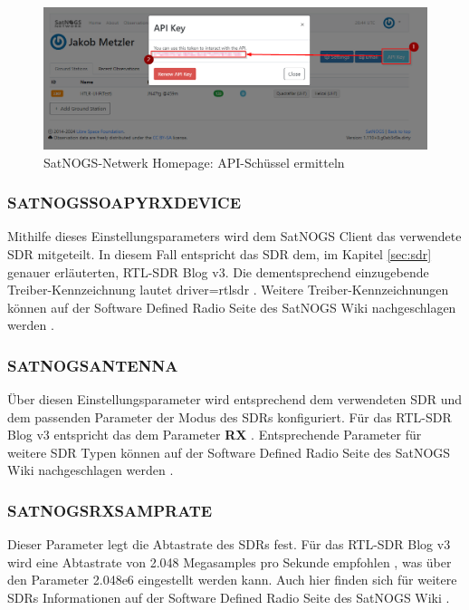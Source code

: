 \begin{figure} [H]
	\centering
	\includegraphics[width=.75\linewidth]{../ref/apitoken.png}
	\caption{SatNOGS-Netwerk Homepage: API-Schüssel ermitteln \cite{noauthor_satnogsdashboard_nodate}}
	\label{fig:apikey}
\end{figure}

\subsubsection{SATNOGS\textunderscore SOAPY\textunderscore RX\textunderscore DEVICE}
Mithilfe dieses Einstellungsparameters wird dem SatNOGS Client das verwendete SDR mitgeteilt. In diesem Fall entspricht das SDR dem, im Kapitel \ref{sec:sdr} genauer erläuterten, RTL-SDR Blog v3. Die dementsprechend einzugebende Treiber-Kennzeichnung lautet \glqq driver=rtlsdr\grqq{} \cite{noauthor_satnogsclient_nodate}. Weitere Treiber-Kennzeichnungen können auf der Software Defined Radio Seite des SatNOGS Wiki nachgeschlagen werden \cite{noauthor_software_nodate}.

\subsubsection{SATNOGS\textunderscore ANTENNA}
Über diesen Einstellungsparameter wird entsprechend dem verwendeten SDR und dem passenden Parameter der Modus des SDRs konfiguriert. Für das RTL-SDR Blog v3 entspricht das dem Parameter \textbf{RX} \cite{noauthor_satnogsclient_nodate}. Entsprechende Parameter für weitere SDR Typen können auf der Software Defined Radio Seite des SatNOGS Wiki nachgeschlagen werden \cite{noauthor_software_nodate}. 

\subsubsection{SATNOGS\textunderscore RX\textunderscore SAMP\textunderscore RATE}
Dieser Parameter legt die Abtastrate des SDRs fest. Für das RTL-SDR Blog v3 wird eine Abtastrate von 2.048 Megasamples pro Sekunde empfohlen \cite{noauthor_satnogsclient_nodate}, was über den Parameter 2.048e6 eingestellt werden kann. Auch hier finden sich für weitere SDRs Informationen auf der Software Defined Radio Seite des SatNOGS Wiki \cite{noauthor_software_nodate}. 

